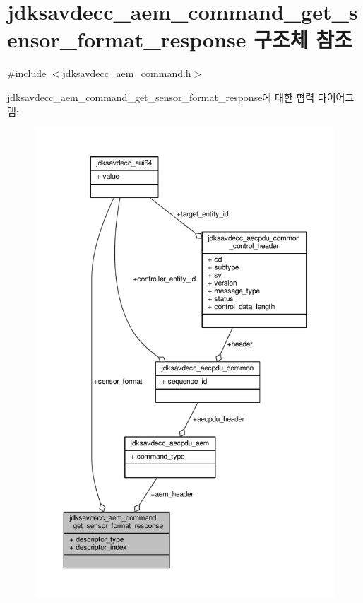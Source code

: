 \hypertarget{structjdksavdecc__aem__command__get__sensor__format__response}{}\section{jdksavdecc\+\_\+aem\+\_\+command\+\_\+get\+\_\+sensor\+\_\+format\+\_\+response 구조체 참조}
\label{structjdksavdecc__aem__command__get__sensor__format__response}


{\ttfamily \#include $<$jdksavdecc\+\_\+aem\+\_\+command.\+h$>$}



jdksavdecc\+\_\+aem\+\_\+command\+\_\+get\+\_\+sensor\+\_\+format\+\_\+response에 대한 협력 다이어그램\+:
\nopagebreak
\begin{figure}[H]
\begin{center}
\leavevmode
\includegraphics[width=350pt]{structjdksavdecc__aem__command__get__sensor__format__response__coll__graph}
\end{center}
\end{figure}
